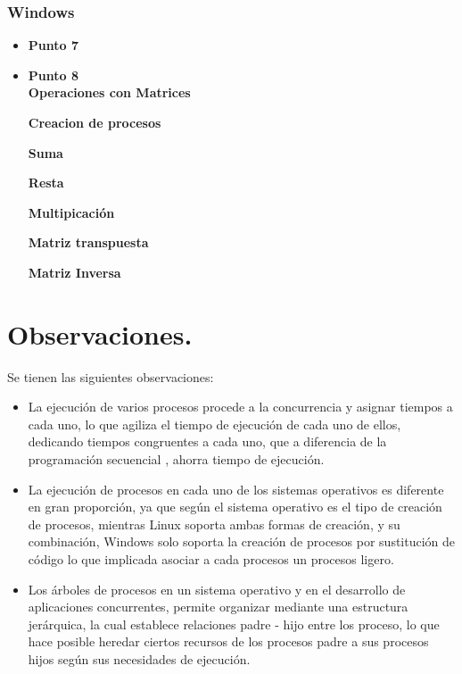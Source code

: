 \documentclass[12pt]{article}
\begin{document}
    \subsubsection{Windows}
        \begin{itemize}
             \item \textbf{Punto 7}
              
                
                
                
                
              \item \textbf{Punto 8}\\
              \textbf{Operaciones con Matrices}
                 
                 \textbf{Creacion de procesos}
                
                 \textbf{Suma}
                 
                \textbf{Resta}
                 
                 \newpage
                \textbf{Multipicación}
                  
                  \newpage
                \textbf{Matriz transpuesta}
                  
                \textbf{Matriz Inversa}
                  
                
        \end{itemize}
            
    
    \newpage
\section{Observaciones.}
Se tienen las siguientes observaciones: 
\begin{itemize}
    \item La ejecución de varios procesos procede a la concurrencia y asignar tiempos a cada uno, lo que agiliza el tiempo de ejecución de cada uno de ellos, dedicando tiempos congruentes a cada uno, que a diferencia de la programación secuencial , ahorra tiempo de ejecución.
    \item La ejecución de procesos en cada uno de los sistemas operativos es diferente en gran proporción, ya que según el sistema operativo es el tipo de creación de procesos, mientras Linux soporta ambas formas de creación, y su combinación, Windows solo soporta la creación de procesos por sustitución de código lo que implicada asociar a cada procesos un procesos ligero.
    \item Los árboles de procesos en un sistema operativo y en el desarrollo de aplicaciones concurrentes, permite organizar mediante una estructura jerárquica, la cual establece relaciones padre - hijo entre los proceso, lo que hace posible heredar ciertos recursos de los procesos padre a sus procesos hijos según sus necesidades de ejecución. 
\end{itemize}
\end{document}
